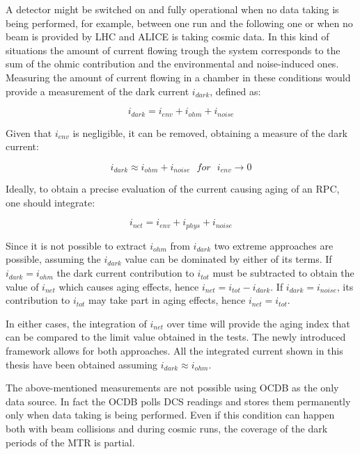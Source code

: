 A detector might be switched on and fully operational when no data taking is being performed, for example, between one run and the following one or when no beam is provided by LHC and ALICE is taking cosmic data.
In this kind of situations the amount of current flowing trough the system corresponds to the sum of the ohmic contribution and the environmental and noise-induced ones.
Measuring the amount of current flowing in a chamber in these conditions would provide a measurement of the dark current $i_{dark}$, defined as:

\begin{equation}
\label{eq:idark1}
i_{dark}=i_{env}+i_{ohm}+i_{noise}
\end{equation}

Given that $i_{env}$ is negligible, it can be removed, obtaining a measure of the dark current:

\begin{equation}
\label{eq:idark}
i_{dark}\approx i_{ohm}+i_{noise}\ \ \ for\ \ \ i_{env}\rightarrow0
\end{equation}

Ideally, to obtain a precise evaluation of the current causing aging of an RPC, one should integrate:

\begin{equation}
\label{eq:inet}
i_{net}=i_{env}+i_{phys}+i_{noise}
\end{equation}

Since it is not possible to extract $i_{ohm}$ from $i_{dark}$ two extreme approaches are possible, assuming the $i_{dark}$ value can be dominated by either of its terms.
If $i_{dark}=i_{ohm}$ the dark current contribution to $i_{tot}$ must be subtracted to obtain the value of $i_{net}$ which causes aging effects, hence $i_{net}=i_{tot}-i_{dark}$.
If $i_{dark}=i_{noise}$, its contribution to $i_{tot}$ may take part in aging effects, hence $i_{net}=i_{tot}$.

In either cases, the integration of $i_{net}$ over time will provide the aging index that can be compared to the limit value obtained in the tests.
The newly introduced framework allows for both approaches.
All the integrated current shown in this thesis have been obtained assuming $i_{dark}\approx i_{ohm}$.

The above-mentioned measurements are not possible using OCDB as the only data source.
In fact the OCDB polls DCS readings and stores them permanently only when data taking is being performed.
Even if this condition can happen both with beam collisions and during cosmic runs, the coverage of the dark periods of the MTR is partial.

